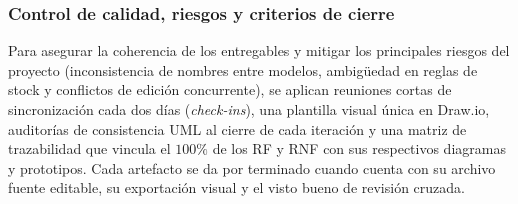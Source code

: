 \subsubsection*{Control de calidad, riesgos y criterios de cierre}
Para asegurar la coherencia de los entregables y mitigar los principales riesgos del proyecto (inconsistencia de nombres entre modelos, ambigüedad en reglas de stock y conflictos de edición concurrente), se aplican reuniones cortas de sincronización cada dos días (\textit{check-ins}), una plantilla visual única en Draw.io, auditorías de consistencia UML al cierre de cada iteración y una matriz de trazabilidad que vincula el $100\%$ de los RF y RNF con sus respectivos diagramas y prototipos. Cada artefacto se da por terminado cuando cuenta con su archivo fuente editable, su exportación visual y el visto bueno de revisión cruzada.